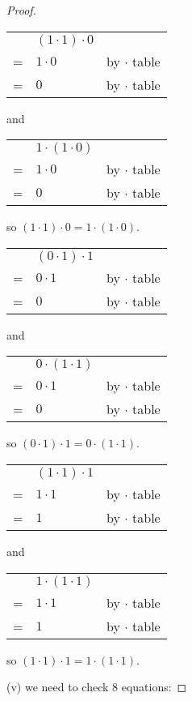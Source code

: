 \documentclass[14pt]{extarticle}
\newcommand{\cy}{\color{cyan}}
\begin{document}
\begin{proof}
  \begin{tabular}{cll}
      & \((1 \cdot 1) \cdot 0\) &                        \\
    = & \(1 \cdot 0\)           & {\cy by $\cdot$ table} \\
    = & \(0\)                   & {\cy by $\cdot$ table}
  \end{tabular}
  and
  \begin{tabular}{cll}
      & \(1 \cdot (1 \cdot 0)\) &                        \\
    = & \(1 \cdot 0\)           & {\cy by $\cdot$ table} \\
    = & \(0\)                   & {\cy by $\cdot$ table}
  \end{tabular}
  so \((1 \cdot 1) \cdot 0 = 1 \cdot (1 \cdot 0)\).

  \begin{tabular}{cll}
      & \((0 \cdot 1) \cdot 1\) &                        \\
    = & \(0 \cdot 1\)           & {\cy by $\cdot$ table} \\
    = & \(0\)                   & {\cy by $\cdot$ table}
  \end{tabular}
  and
  \begin{tabular}{cll}
      & \(0 \cdot (1 \cdot 1)\) &                        \\
    = & \(0 \cdot 1\)           & {\cy by $\cdot$ table} \\
    = & \(0\)                   & {\cy by $\cdot$ table}
  \end{tabular}
  so \((0 \cdot 1) \cdot 1 = 0 \cdot (1 \cdot 1)\).

  \begin{tabular}{cll}
      & \((1 \cdot 1) \cdot 1\) &                        \\
    = & \(1 \cdot 1\)           & {\cy by $\cdot$ table} \\
    = & \(1\)                   & {\cy by $\cdot$ table}
  \end{tabular}
  and
  \begin{tabular}{cll}
      & \(1 \cdot (1 \cdot 1)\) &                        \\
    = & \(1 \cdot 1\)           & {\cy by $\cdot$ table} \\
    = & \(1\)                   & {\cy by $\cdot$ table}
  \end{tabular}
  so \((1 \cdot 1) \cdot 1 = 1 \cdot (1 \cdot 1)\).

  (v) we need to check 8 equations:


\end{proof}
\end{document}

